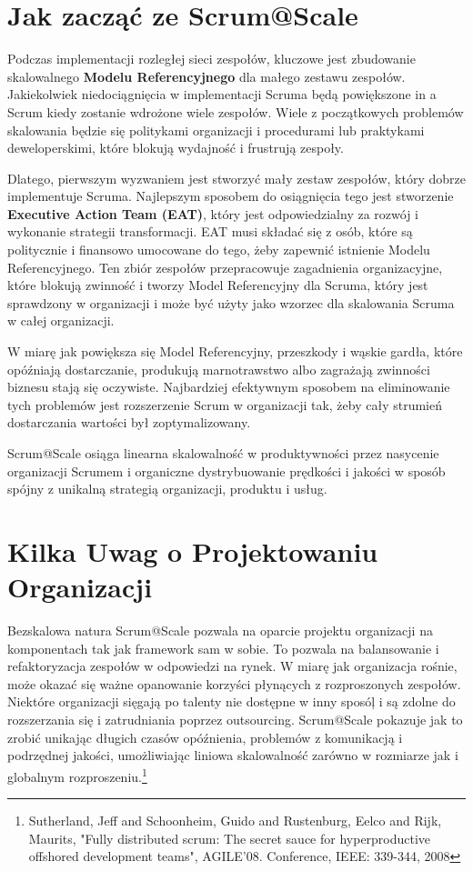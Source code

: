 \documentclass[12pt,a4paper,parskip=full]{scrartcl}
\begin{document}
\section{Jak zacząć ze Scrum@Scale}

Podczas implementacji rozległej sieci zespołów, kluczowe jest zbudowanie skalowalnego \textbf{Modelu Referencyjnego} dla małego zestawu zespołów. 
Jakiekolwiek niedociągnięcia w implementacji Scruma będą powiększone in a Scrum kiedy zostanie wdrożone wiele zespołów. Wiele z początkowych problemów skalowania będzie się politykami organizacji i procedurami lub praktykami deweloperskimi, które blokują wydajność i frustrują zespoły.

Dlatego, pierwszym wyzwaniem jest stworzyć mały zestaw zespołów, który dobrze implementuje Scruma. Najlepszym sposobem do osiągnięcia tego jest stworzenie \textbf{Executive Action Team (EAT)}, który jest odpowiedzialny za rozwój i wykonanie strategii transformacji. EAT musi składać się z osób, które są politycznie i finansowo umocowane do tego, żeby zapewnić istnienie Modelu Referencyjnego. Ten zbiór zespołów przepracowuje zagadnienia organizacyjne, które blokują zwinność i tworzy Model Referencyjny dla Scruma, który jest sprawdzony w organizacji i może być użyty jako wzorzec dla skalowania Scruma w całej organizacji.

W miarę jak powiększa się Model Referencyjny, przeszkody i wąskie gardła, które opóźniają dostarczanie, produkują marnotrawstwo albo zagrażają zwinności biznesu stają się oczywiste. Najbardziej efektywnym sposobem na eliminowanie tych problemów jest rozszerzenie Scrum w organizacji tak, żeby cały strumień dostarczania wartości był zoptymalizowany.

Scrum@Scale osiąga linearna skalowalność w produktywności przez nasycenie organizacji Scrumem i organiczne dystrybuowanie prędkości i jakości w sposób spójny z unikalną strategią organizacji, produktu i usług.

\section{Kilka Uwag o Projektowaniu Organizacji}

Bezskalowa natura Scrum@Scale pozwala na oparcie projektu organizacji na komponentach tak jak framework sam w sobie. To pozwala na balansowanie i refaktoryzacja zespołów w odpowiedzi na rynek. W miarę jak organizacja rośnie, może okazać się ważne opanowanie korzyści płynących z rozproszonych zespołów. Niektóre organizacji sięgają po talenty nie dostępne w inny sposóļ i są zdolne do rozszerzania się i zatrudniania poprzez outsourcing. Scrum@Scale pokazuje jak to zrobić unikając długich czasów opóźnienia, problemów z komunikacją i podrzędnej jakości, umożliwiając liniowa skalowalność zarówno w rozmiarze jak i globalnym rozproszeniu.\footnote{Sutherland, Jeff and Schoonheim, Guido and Rustenburg, Eelco and Rijk, Maurits, "Fully distributed scrum: The secret sauce for hyperproductive offshored development teams", AGILE'08. Conference, IEEE: 339-344, 2008}
\end{document}
